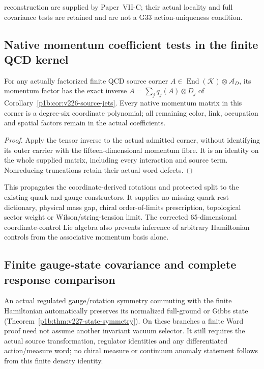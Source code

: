 \documentclass[12pt,a4paper]{article}
\begin{document}
reconstruction are supplied by Paper~VII-C; their actual locality and full
covariance tests are retained and are not a G33 action-uniqueness condition.


\subsection{Native momentum coefficient tests in the finite QCD kernel}
\label{p10:sec:v226-qcd-native-coefficients}
\begin{corollary}
\label{p10:cor:v226-qcd-native-coefficients}
For any actually factorized finite QCD source corner
$A\in\operatorname{End}(\mathcal K)\otimes\mathcal A_D$, its momentum
factor has the exact inverse
$A=\sum_jq_j(A)\otimes D_j$ of
Corollary~\ref{p1b:cor:v226-source-jets}. Every native momentum matrix in
this corner is a degree-six coordinate polynomial; all remaining color,
link, occupation and spatial factors remain in the actual coefficients.
\end{corollary}
\begin{proof}
Apply the tensor inverse to the actual admitted corner, without identifying
its outer carrier with the fifteen-dimensional momentum fibre. It is an
identity on the whole supplied matrix, including every interaction and source
term. Nonreducing truncations retain their actual word defects.
\end{proof}
This propagates the coordinate-derived rotations and protected split to
the existing quark and gauge constructors. It supplies no missing quark
rest dictionary, physical mass gap, chiral order-of-limits prescription,
topological sector weight or Wilson/string-tension limit. The corrected
65-dimensional coordinate-control Lie algebra also prevents inference of
arbitrary Hamiltonian controls from the associative momentum basis alone.



\subsection{Finite gauge-state covariance and complete response comparison}
\label{p10:sec:v227-gauge-covariance}
An actual regulated gauge/rotation symmetry commuting with the finite
Hamiltonian automatically preserves its normalized full-ground or Gibbs
state (Theorem~\ref{p1b:thm:v227-state-symmetry}). On these branches a
finite Ward proof need not assume another invariant vacuum selector.
It still requires the actual source transformation, regulator identities
and any differentiated action/measure word; no chiral measure or
continuum anomaly statement follows from this finite density identity.
\end{document}
